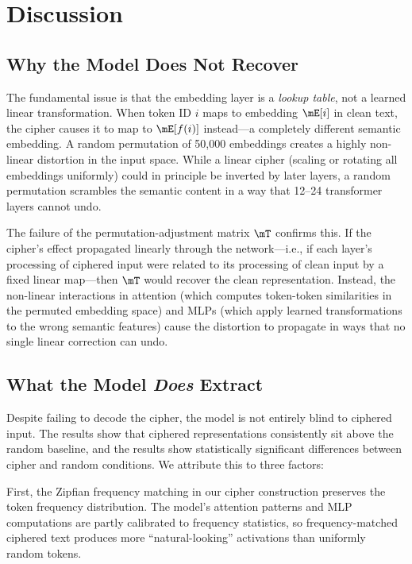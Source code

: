 \section{Discussion}
\label{sec:discussion}

\subsection{Why the Model Does Not Recover}
\label{sec:why}

The fundamental issue is that the embedding layer is a \emph{lookup table}, not a learned linear transformation. When token ID $i$ maps to embedding $\embmat[i]$ in clean text, the cipher causes it to map to $\embmat[\perm(i)]$ instead---a completely different semantic embedding. A random permutation of 50{,}000 embeddings creates a highly non-linear distortion in the input space. While a linear cipher (\eg scaling or rotating all embeddings uniformly) could in principle be inverted by later layers, a random permutation scrambles the semantic content in a way that 12--24 transformer layers cannot undo.

The failure of the permutation-adjustment matrix $\permmat$ confirms this. If the cipher's effect propagated linearly through the network---i.e., if each layer's processing of ciphered input were related to its processing of clean input by a fixed linear map---then $\permmat$ would recover the clean representation. Instead, the non-linear interactions in attention (which computes token-token similarities in the permuted embedding space) and MLPs (which apply learned transformations to the wrong semantic features) cause the distortion to propagate in ways that no single linear correction can undo.

\subsection{What the Model \emph{Does} Extract}
\label{sec:extract}

Despite failing to decode the cipher, the model is not entirely blind to ciphered input. The \pythia results show that ciphered representations consistently sit above the random baseline, and the \gpttwo results show statistically significant differences between cipher and random conditions. We attribute this to three factors:

First, the Zipfian frequency matching in our cipher construction preserves the token frequency distribution. The model's attention patterns and MLP computations are partly calibrated to frequency statistics, so frequency-matched ciphered text produces more ``natural-looking'' activations than uniformly random tokens.

